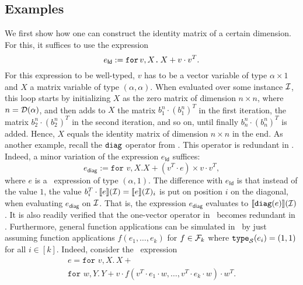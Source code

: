 \subsection{Examples}
We first show how one can construct the identity matrix of a certain dimension. For this, it suffices to use the expression $$e_{\mathsf{Id}}:=\texttt{for}\, v,X \texttt{.}\, X + v\cdot v^T.$$ For this expression to be well-typed, $v$ has to be a vector variable of type $\alpha\times 1$ and $X$ a matrix variable of type $(\alpha,\alpha)$. When evaluated over some instance $\mathcal{I}$, this loop starts by initializing $X$ as the zero matrix of dimension $n\times n$, where $n=\mathcal{D}(\alpha)$, and then adds to $X$ the matrix $b_1^n\cdot (b_1^n)^T$ in the first iteration, the matrix $b_2^n\cdot (b_2^n)^T$ in the second iteration, and so on, until finally $b_n^n\cdot (b_n^n)^T$ is added. Hence, $X$ equals the identity matrix of dimension $n\times n$ in the end.
As another example, recall the $\texttt{diag}$ operator from \lang.	This operator is redundant in \langfor. Indeed, a minor variation of the expression $e_{\mathsf{Id}}$ suffices:
$$e_{\mathsf{diag}}:=\texttt{for } v, X. X + (v^T\cdot e) \times v\cdot v^T,$$ where $e$ is a \langfor\  expression of type $(\alpha,1)$. The difference with $e_{\mathsf{Id}}$ is that instead of the value $1$, the value 
$b_i^T\cdot\llbracket e \rrbracket(\mathcal{I})=\llbracket e \rrbracket(\mathcal{I})_{i}$ is put on position $i$ on the diagonal, when evaluating $e_{\mathsf{diag}}$ on $\mathcal{I}$.
That is, the expression $e_{\mathsf{diag}}$ evaluates to $\llbracket \texttt{diag}(e) \rrbracket(\mathcal{I})$. It is also readily verified that the one-vector operator in \lang\ becomes redundant in \langfor. Furthermore, general function applications can be simulated in \langfor\ by just assuming function applications $f(e_1,\ldots,e_k)$ for $f\in\mathcal{F}_k$ where $\texttt{type}_{\mathcal{S}}(e_i)=(1,1)$ for all $i\in[k]$. Indeed,  consider the \langfor\ expression 
\begin{multline*}
e=\texttt{for }v,X.\, X + \\ 
\texttt{for }w,Y.\, Y + v\cdot f(v^T\cdot e_1\cdot w, \ldots, v^T\cdot e_k\cdot w)\cdot w^T. 
\end{multline*}
